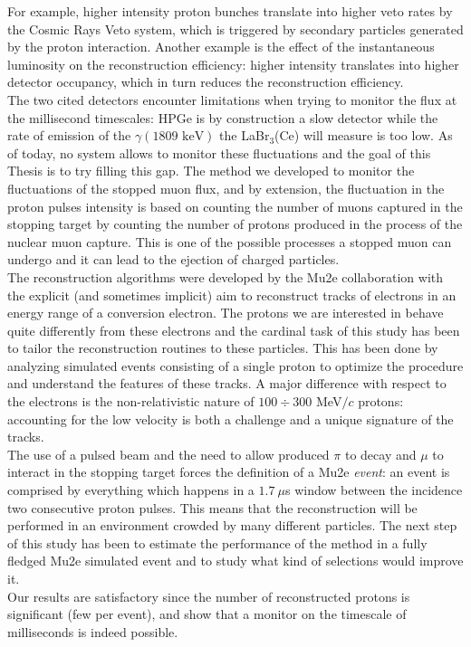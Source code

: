 \documentclass[12pt,a4paper,openright, oneside, titlepage]{book} %
\begin{document}
\begin{changemargin}{1cm}{1cm}
For example, higher intensity proton bunches translate into higher veto rates by the Cosmic Rays Veto system, 
which is triggered by secondary particles generated by the proton interaction. 
Another example is the effect of the instantaneous luminosity on the reconstruction efficiency: higher intensity translates into higher detector occupancy, which in turn reduces the reconstruction efficiency.\\
The two cited detectors encounter limitations when trying to monitor the flux at the millisecond timescales: HPGe is by construction a slow detector while the rate of emission of the $\gamma (1809\textrm{ keV})$ the LaBr$_3$(Ce) will measure is too low.
As of today, no system allows to monitor these fluctuations and the goal of this Thesis is to try filling this gap.
The method we developed to monitor the fluctuations of the stopped muon flux, and by extension, the fluctuation in the proton pulses intensity is based on counting the number of muons captured in the stopping target by counting the number of protons produced in the process of the nuclear muon capture.
This is one of the possible processes a stopped muon can undergo and it can lead to the ejection of charged particles.\\
The reconstruction algorithms were developed by the Mu2e collaboration with the explicit (and sometimes implicit) aim to reconstruct tracks of electrons in an energy range of a conversion electron. 
The protons we are interested in behave quite differently from these electrons and the cardinal task of this study has been to tailor the reconstruction routines to these particles. 
This has been done by analyzing simulated events consisting of a single proton to optimize the procedure and understand the features of these tracks. 
A major difference with respect to the electrons is the non-relativistic nature of $100\div300$ MeV$/c$ protons: accounting for the low velocity is both a challenge and a unique signature of the tracks.\\
The use of a pulsed beam and the need to allow produced $\pi$ to decay and $\mu$ to interact in the stopping target forces the definition of a Mu2e \textit{event}: an event is comprised by everything which happens in a $1.7\ \mu$s window between the incidence two consecutive proton pulses.
This means that the reconstruction will be performed in an environment crowded by many different particles.
The next step of this study has been to estimate the performance of the method in a fully fledged Mu2e simulated event and to study what kind of selections would improve it.\\
Our results are satisfactory since the number of reconstructed protons is significant (few per event), and show that a monitor on the timescale of milliseconds is indeed possible.

\end{changemargin}
\end{document}
